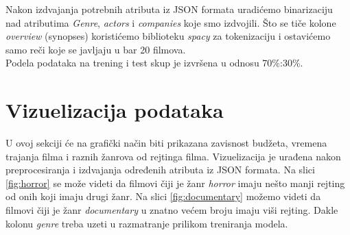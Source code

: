 \documentclass[a4paper]{article}
\begin{document}
Nakon izdvajanja potrebnih atributa iz JSON formata uradićemo binarizaciju nad atributima \textit{Genre}, \textit{actors} i \textit{companies} koje smo izdvojili.
Što se tiče kolone \textit{overview} (synopses) koristićemo biblioteku \textit{spacy} \cite{spacy} za tokenizaciju i ostavićemo samo reči koje se javljaju u bar 20 filmova.\\

Podela podataka na trening i test skup je izvršena u odnosu 70\%:30\%.\\

\section{Vizuelizacija podataka}
\label{sec:vizuelizacija}

U ovoj sekciji će na grafički način biti prikazana zavisnost budžeta, vremena trajanja filma i raznih žanrova od rejtinga filma. Vizuelizacija je urađena nakon preprocesiranja i izdvajanja određenih atributa iz JSON formata. Na slici \ref{fig:horror} se može videti da filmovi čiji je žanr \textit{horror} imaju nešto manji rejting od onih koji imaju drugi žanr. Na slici  \ref{fig:documentary} možemo videti da filmovi čiji je žanr \textit{documentary} u znatno većem broju imaju viši rejting. Dakle kolonu \textit{genre} treba uzeti u razmatranje prilikom treniranja modela.
\end{document}
